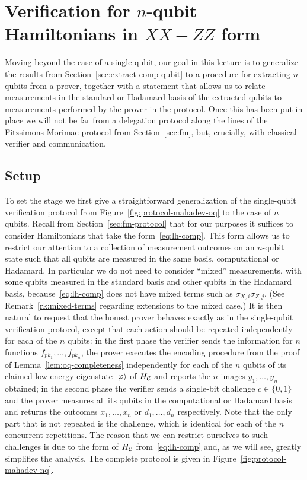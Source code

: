 \chapter{Verification for $n$-qubit Hamiltonians in $XX-ZZ$ form}
\label{chap:nqubit}


Moving beyond the case of a single qubit, our goal in this lecture is to generalize the results from Section~\ref{sec:extract-comp-qubit} to a procedure for extracting $n$ qubits from a prover, together with a statement that allows us to relate measurements in the standard or Hadamard basis of the extracted qubits to measurements performed by the prover in the protocol. Once this has been put in place we will not be far from a delegation protocol along the lines of the Fitzsimons-Morimae protocol from Section~\ref{sec:fm}, but, crucially, with classical verifier and communication. 

\section{Setup}

To set the stage we first give a straightforward generalization of the single-qubit verification protocol from Figure~\ref{fig:protocol-mahadev-oq} to the case of $n$ qubits. Recall from Section~\ref{sec:fm-protocol} that for our purposes it suffices to consider Hamiltonians that take the form~\eqref{eq:lh-comp}. This form allows us to restrict our attention to a collection of measurement outcomes on an $n$-qubit state such that all qubits are measured in the same basis, computational or Hadamard. In particular we do not need to consider ``mixed'' measurements, with some qubits measured in the standard basis and other qubits in the Hadamard basis, because~\eqref{eq:lh-comp} does not have mixed terms such as $\sigma_{X,i}\sigma_{Z,j}$. (See Remark~\ref{rk:mixed-terms} regarding extensions to the mixed case.) It is then natural to request that the honest prover behaves exactly as in the single-qubit verification protocol, except that each action should be repeated independently for each of the $n$ qubits: in the first phase the verifier sends the information for $n$ functions $f_{pk_1},\ldots,f_{pk_n}$, the prover executes the encoding procedure from the proof of Lemma~\ref{lem:oq-completeness} independently for each of the $n$ qubits of its claimed low-energy eigenstate $|\varphi\rangle$ of $H_{\mathcal{C}}$ and reports the $n$ images $y_1,\ldots,y_n$ obtained; in the second phase the verifier sends a single-bit challenge $c\in\{0,1\}$ and the prover measures all its qubits in the computational or Hadamard basis and returns the outcomes $x_1,\ldots,x_n$ or $d_1,\ldots,d_n$ respectively. Note that the only part that is not repeated is the challenge, which is identical for each of the $n$ concurrent repetitions. The reason that we can restrict ourselves to such challenges is due to the form of $H_{\mathcal{C}}$ from~\eqref{eq:lh-comp} and, as we will see, greatly simplifies the analysis. The complete  protocol is given in Figure~\ref{fig:protocol-mahadev-nq}.

